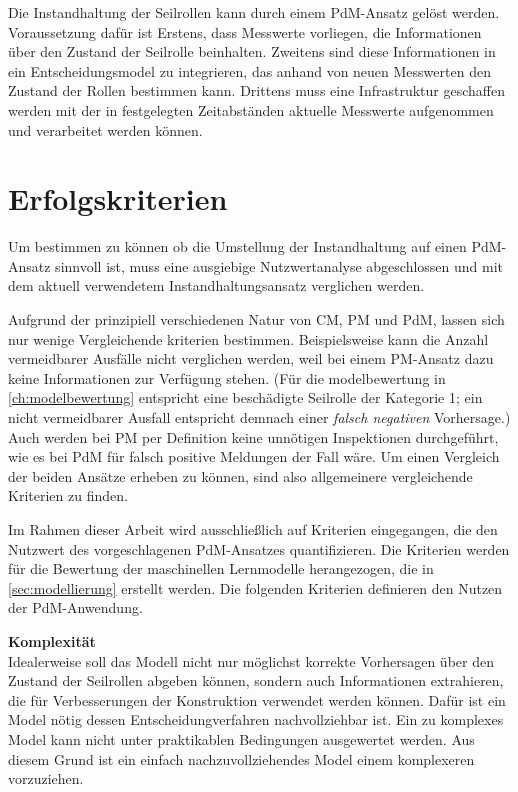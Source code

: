 Die Instandhaltung der Seilrollen kann durch einem PdM-Ansatz gelöst werden. Voraussetzung dafür ist Erstens, dass Messwerte vorliegen, die Informationen über den Zustand der Seilrolle beinhalten. Zweitens sind diese Informationen in ein Entscheidungsmodel zu integrieren, das anhand von neuen Messwerten den Zustand der Rollen bestimmen kann. Drittens muss eine Infrastruktur geschaffen werden mit der in festgelegten Zeitabständen aktuelle Messwerte aufgenommen und verarbeitet werden können.
\section{Erfolgskriterien}
\label{sec:erfolgskriterien_usecase}
Um bestimmen zu können ob die Umstellung der Instandhaltung auf einen PdM-Ansatz sinnvoll ist, muss eine ausgiebige Nutzwertanalyse abgeschlossen und mit dem aktuell verwendetem Instandhaltungsansatz verglichen werden. 

Aufgrund der prinzipiell verschiedenen Natur von CM, PM und PdM, lassen sich nur wenige Vergleichende kriterien bestimmen. Beispielsweise kann die Anzahl vermeidbarer Ausfälle nicht verglichen werden, weil bei einem PM-Ansatz dazu keine Informationen zur Verfügung stehen. (Für die modelbewertung in \cref{ch:modelbewertung} entspricht eine beschädigte Seilrolle der Kategorie 1; ein nicht vermeidbarer Ausfall entspricht demnach einer \textit{falsch negativen} Vorhersage.) Auch werden bei PM per Definition keine unnötigen Inspektionen durchgeführt, wie es bei PdM für falsch positive Meldungen der Fall wäre. Um einen Vergleich der beiden Ansätze erheben zu können, sind also allgemeinere vergleichende Kriterien zu finden.

Im Rahmen dieser Arbeit wird ausschließlich auf Kriterien eingegangen, die den Nutzwert des vorgeschlagenen PdM-Ansatzes quantifizieren. Die Kriterien werden für die Bewertung der maschinellen Lernmodelle herangezogen, die in \cref{sec:modellierung} erstellt werden. Die folgenden Kriterien definieren den Nutzen der PdM-Anwendung.

\textbf{Komplexität}\\
Idealerweise soll das Modell nicht nur möglichst korrekte Vorhersagen über den Zustand der Seilrollen abgeben können, sondern auch Informationen extrahieren, die für Verbesserungen der Konstruktion verwendet werden können. Dafür ist ein Model nötig dessen Entscheidungverfahren nachvollziehbar ist. Ein zu komplexes Model kann nicht unter praktikablen Bedingungen ausgewertet werden. Aus diesem Grund ist ein einfach nachzuvollziehendes Model einem komplexeren vorzuziehen.


